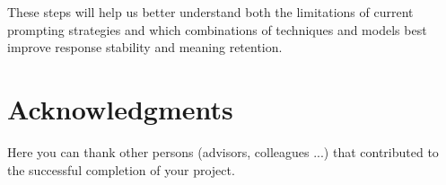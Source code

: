 \documentclass[fleqn,moreauthors,10pt]{ds_report}
\begin{document}
These steps will help us better understand both the limitations of current prompting strategies and which combinations of techniques and models best improve response stability and meaning retention.


\section*{Acknowledgments}

Here you can thank other persons (advisors, colleagues ...) that contributed to the successful completion of your project.




\end{document}
